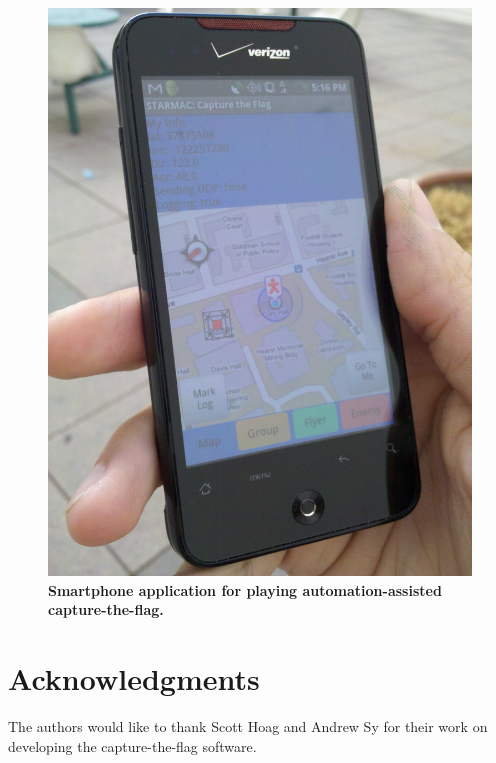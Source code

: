 \documentclass[letterpaper, 10 pt, conference]{ieeeconf}  %
\numberwithin{algorithm}{section}
\begin{document}
\begin{figure}[tb]
	\centering
\includegraphics[width=0.38\linewidth]{figures/starmac_ctf_phone.jpg}  
\caption{\textbf{Smartphone application for playing automation-assisted capture-the-flag. }}
\label{fig:phoneGame}
\end{figure}

\section*{Acknowledgments}
The authors would like to thank Scott Hoag and Andrew Sy for their work on developing the capture-the-flag software.


\vspace{-5mm}



\end{document}
